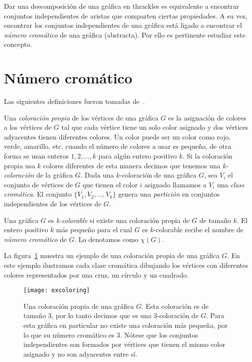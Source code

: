 Dar una descomposición de una gráfica en thrackles es equivalente a encontrar
conjuntos independientes de aristas que comparten ciertas propiedades. A su vez,
encontrar los conjuntos independientes de una gráfica está ligado a encontrar el \emph{número cromático}
de una gráfica (abstracta). Por ello es pertinente estudiar este concepto.

\section{Número cromático}
Las siguientes definiciones fueron tomadas de~\cite{Chartrand2008}.

Una \emph{coloración propia} de los vértices de una gráfica $G$ es la asignación
de colores a los vértices de $G$ tal que cada vértice tiene un solo color
asignado y dos vértices adyacentes tienen diferentes colores.
Un color puede ser un color como rojo, verde, amarillo, etc. cuando el número
de colores a usar es pequeño, de otra forma se usan enteros $1,2,\dots,k$
para algún entero positivo $k$. Si la coloración propia usa $k$ colores
diferentes de esta manera decimos que tenemos una \emph{k-coloración} de la gráfica $G$.
Dada una $k$-coloración de una gráfica $G$, sea $V_i$ el conjunto de vértices
de $G$ que tienen el color $i$ asignado llamamos a $V_i$
una \emph{clase cromática}. El conjunto $\{V_1,V_2,\dots,V_k\}$ genera una \emph{partición}
en conjuntos independientes de los vértices de $G$.

Una gráfica $G$ es \emph{k-colorable} si existe una coloración propia de $G$ de tamaño $k$.
El entero positivo $k$ más pequeño para el cual $G$ es $k$-colorable recibe el nombre
de \emph{número cromático} de $G$. Lo denotamos como $\chi(G)$.

La figura~\ref{fig:excoloring} muestra un ejemplo de una coloración propia de una gráfica $G$.
En este ejemplo ilustramos cada clase cromática dibujando los vértices con diferentes colores
representados por una cruz, un círculo y un cuadrado.
\begin{figure}[htpb]
  \centering
  \texttt{[image: excoloring]}
  \caption{Una coloración propia de una gráfica $G$. Esta coloración es de tamaño 3, por
  lo tanto decimos que es una 3-coloración de $G$. Para esta gráfica en particular
  no existe una coloración más pequeña, por lo que su número cromático es 3. Nótese
  que los conjuntos independientes son formados por vértices que tienen el mismo
  color asignado y no son adyacentes entre sí.}
  \label{fig:excoloring}
\end{figure}

